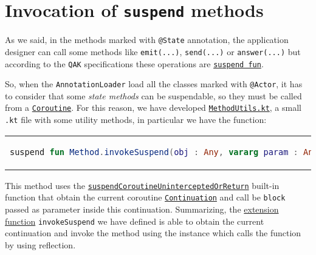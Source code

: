 \section{Invocation of \texttt{suspend} methods}

As we said, in the methods marked with \texttt{@State} annotation, the application designer can call some methods like \texttt{emit(...)}, \texttt{send(...)} or \texttt{answer(...)} but according to the \texttt{QAK} specifications these operations are \href{https://kotlinlang.org/docs/coroutines-basics.html#extract-function-refactoring}{\texttt{suspend fun}}.

So, when the \texttt{AnnotationLoader} load all the classes marked with \texttt{@Actor}, it has to consider that some \textit{state methods} can be suspendable, so they must be called from a \href{https://kotlinlang.org/docs/coroutines-guide.html}{\texttt{Coroutine}}.
For this reason, we have developed \href{https://github.com/LM-96/QA-Extensions/blob/main/it.unibo.qakactor/src/main/kotlin/utils/MethodUtils.kt}{\texttt{MethodUtils.kt}}, a small \texttt{.kt} file with some utility methods, in particular we have the function:
\begin{center}
	\begin{tabular}{c}
		\begin{lstlisting}[frame=none,numbers=none,language=Kotlin]
			suspend fun Method.invokeSuspend(obj : Any, vararg param : Any?) : Any
		\end{lstlisting}
	\end{tabular}
\end{center}

This method uses the \href{https://kotlinlang.org/api/latest/jvm/stdlib/kotlin.coroutines.intrinsics/suspend-coroutine-unintercepted-or-return.html}{\texttt{suspendCoroutineUninterceptedOrReturn}} built-in function that obtain the current coroutine \href{https://kotlinlang.org/api/latest/jvm/stdlib/kotlin.coroutines/-continuation/}{\texttt{Continuation}} and call be \texttt{block} passed as parameter inside this continuation.
Summarizing, the \href{https://kotlinlang.org/docs/extensions.html}{extension function} \texttt{invokeSuspend} we have defined is able to obtain the current continuation and invoke the method using the instance which calls the function by using reflection.

